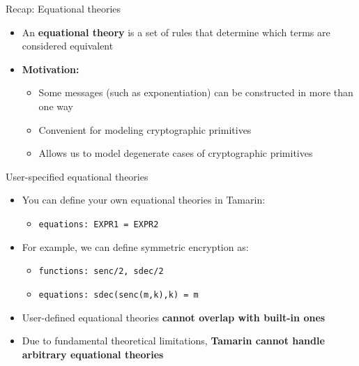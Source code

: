 \documentclass[11pt,aspectratio=169]{beamer}
\begin{document}

\begin{frame}[fragile]{Recap: Equational theories}
    \begin{itemize}
        \item An \textbf{equational theory} is a set of rules that determine 
              which terms are considered equivalent
        \item \textbf{Motivation:}
        \begin{itemize}
            \item Some messages (such as exponentiation) can be constructed in  
                  more than one way
            \item Convenient for modeling cryptographic primitives
            \item Allows us to model degenerate cases of cryptographic 
                  primitives
        \end{itemize}
    \end{itemize}
\end{frame}

\begin{frame}[fragile]{User-specified equational theories}
    \begin{itemize}
        \item You can define your own equational theories in Tamarin:
        \begin{itemize}
            \item[] \verb|equations: EXPR1 = EXPR2|
        \end{itemize}
        \item For example, we can define symmetric encryption as:
        \begin{itemize}
            \item[] \verb|functions: senc/2, sdec/2|
            \item[] \verb|equations: sdec(senc(m,k),k) = m|
        \end{itemize}
        \item User-defined equational theories
              \textbf{cannot overlap with built-in ones}
        \item Due to fundamental theoretical limitations,
              \textbf{Tamarin cannot handle arbitrary equational theories}
    \end{itemize}
\end{frame}
\end{document}
